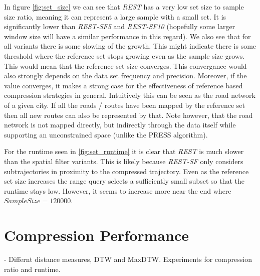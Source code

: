 In figure \ref{fig:set_size} we can see that \textit{REST} has a very low set size to sample size ratio, meaning it can represent a large sample with a small set. It is significantly lower than \textit{REST-SF5} and \textit{REST-SF10} (hopefully some larger window size will have a similar performance in this regard). We also see that for all variants there is some slowing of the growth. This might indicate there is some threshold where the reference set stops growing even as the sample size grows. This would mean that the reference set size converges. This convergance would also strongly depends on the data set frequency and precision. Moreover, if the value converges, it makes a strong case for the effectiveness of reference based compression strategies in general. Intuitively this can be seen as the road network of a given city. If all the roads / routes have been mapped by the reference set then all new routes can also be represented by that. Note however, that the road network is not mapped directly, but indirectly through the data itself while supporting an unconstrained space (unlike the PRESS algorithm).

For the runtime seen in \ref{fig:set_runtime} it is clear that \textit{REST} is much slower than the spatial filter variants. This is likely because \textit{REST-SF} only considers subtrajectories in proximity to the compressed trajectory. Even as the reference set size increases the range query selects a sufficiently small subset so that the runtime stays low. However, it seems to increase more near the end where $Sample Size = 120 000$.

\section{Compression Performance}
- Differnt distance measures, DTW and MaxDTW. Experiments for compression ratio and runtime.